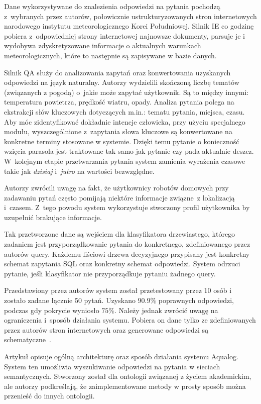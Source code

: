 Dane wykorzystywane do znalezienia odpowiedzi na pytania pochodzą z~wybranych przez autorów, połowicznie ustrukturyzowanych stron internetowych narodowego instytutu meteorologicznego Korei Południowej. Silnik IE co godzinę pobiera z~odpowiedniej strony internetowej najnowsze dokumenty, parsuje je i wydobywa zdyskretyzowane informacje o aktualnych warunkach meteorologicznych, które to następnie są zapisywane w bazie danych. 

Silnik QA służy do analizowania zapytań oraz konwertowania uzyskanych odpowiedzi na język naturalny. Autorzy \cite{restrictedWeather} wydzielili skończoną liczbę tematów (związanych z pogodą) o~jakie może zapytać użytkownik. Są to między innymi: temperatura powietrza, prędkość wiatru, opady. Analiza pytania polega na ekstrakcji słów kluczowych dotyczących m.in.: tematu pytania, miejsca, czasu. Aby móc zidentyfikować dokładnie intencje człowieka, przy użyciu specjalnego modułu, wyszczególnione z~zapytania słowa kluczowe są konwertowane na konkretne terminy stosowane w systemie. Dzięki temu pytanie o konieczność wzięcia parasola jest traktowane tak samo jak pytanie czy pada aktualnie deszcz. W~kolejnym etapie przetwarzania pytania system zamienia wyrażenia czasowe takie jak \textit{dzisiaj} i~\textit{jutro} na wartości bezwzględne.

Autorzy \cite{restrictedWeather} zwrócili uwagę na fakt, że użytkownicy robotów domowych przy zadawaniu pytań często pomijają niektóre informacje związne~z lokalizacją i~czasem. Z~tego powodu system wykorzystuje stworzony profil użytkownika by uzupełnić brakujące informacje.

Tak przetworzone dane są wejściem dla klasyfikatora drzewiastego, którego zadaniem jest przyporządkowanie pytania do konkretnego, zdefiniowanego przez autorów query. Każdemu liściowi drzewa decyzyjnego przypisany jest konkretny schemat zapytania SQL oraz konkretny schemat odpowiedzi. System odrzuci pytanie, jeśli klasyfikator nie przyporządkuje pytaniu żadnego query.

Przedstawiony przez autorów \cite{restrictedWeather} system został przetestowany przez 10 osób i~ zostało zadane łącznie 50 pytań. Uzyskano $\num{90.9}$\% poprawnych odpowiedzi, podczas gdy pokrycie wyniosło $\num{75}$\%. Należy jednak zwrócić uwagę na ograniczenia i~sposób działania systemu. Pobiera on dane tylko ze zdefiniowanych przez autorów stron internetowych oraz generowane odpowiedzi są schematyczne~\cite{restrictedWeather}.

Artykuł \cite{lopez2005aqualog} opisuje ogólną architekturę oraz sposób działania systemu Aqualog. System ten umożliwia wyszukiwanie odpowiedzi na pytania w sieciach semantycznych. Stworzony został dla ontologii związanej z życiem akademickim, ale autorzy podkreślają, że zaimplementowane metody w prosty sposób można przenieść do innych ontologii.

